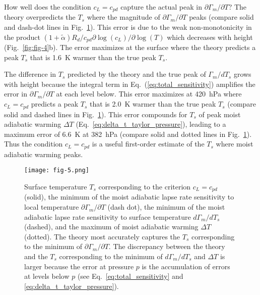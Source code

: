 \documentclass[]{ametsocV6.1}
\begin{document}
How well does the condition $c_L = c_{pd}$ capture the actual peak in $\partial\Gamma_m/\partial T$? The theory overpredicts the $T_s$ where the magnitude of $\partial\Gamma_m/\partial T$ peaks (compare solid and dash-dot lines in Fig.~\ref{fig:fig-5}). This error is due to the weak non-monotonicity in the product $(1+\tilde{\alpha})R_d/c_{pd}\partial\log(c_L)/\partial\log(T)$ which decreases with height (Fig.~\ref{fig:fig-4}b). The error maximizes at the surface where the theory predicts a peak $T_s$ that is 1.6~K warmer than the true peak $T_s$. 

The difference in $T_s$ predicted by the theory and the true peak of $\Gamma_m / d T_s$ grows with height because the integral term in Eq.~(\ref{eq:total_sensitivity}) amplifies the error in $\partial\Gamma_m / \partial T$ at each level below. This error maximizes at 420~hPa where $c_L = c_{pd}$ predicts a peak $T_s$ that is 2.0~K warmer than the true peak $T_s$ (compare solid and dashed lines in Fig.~\ref{fig:fig-5}). This error compounds for $T_s$ of peak moist adiabatic warming $\Delta T$ (Eq.~\ref{eq:delta_t_taylor_pressure}), leading to a maximum error of 6.6~K at 382~hPa (compare solid and dotted lines in Fig.~\ref{fig:fig-5}). Thus the condition $c_L = c_{pd}$ is a useful first-order estimate of the $T_s$ where moist adiabatic warming peaks.

\begin{figure}[htbp]
 \centering
 \texttt{[image: fig-5.png]}\\
 \caption{Surface temperature $T_s$ corresponding to the criterion $c_L=c_{pd}$ (solid), the minimum of the moist adiabatic lapse rate sensitivity to local temperature $\partial \Gamma_m/\partial T$ (dash dot), the minimum of the moist adiabatic lapse rate sensitivity to surface temperature $d \Gamma_m/dT_s$ (dashed), and the maximum of moist adiabatic warming $\Delta T$ (dotted). The theory most accurately captures the $T_s$ corresponding to the minimum of $\partial \Gamma_m /\partial T$. The discrepancy between the theory and the $T_s$ corresponding to the minimum of $d\Gamma_m/dT_s$ and $\Delta T$ is larger because the error at pressure $p$ is the accumulation of errors at levels below $p$ (see Eq.~\ref{eq:total_sensitivity} and \ref{eq:delta_t_taylor_pressure}).}\label{fig:fig-5}
\end{figure}
\end{document}
